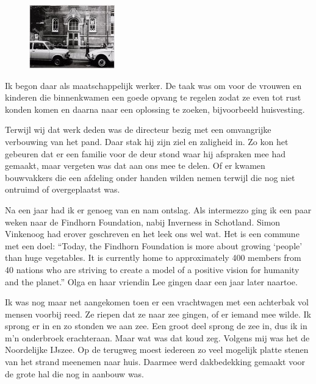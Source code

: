 \documentclass[10pt,twoside, openright]{memoir}
\begin{document}
\begin{figure}
\includegraphics[width=\textwidth]{img/ch43/hvo}
\end{figure}

Ik begon daar als maatschappelijk werker. De taak was om voor de vrouwen en kinderen die binnenkwamen een goede opvang te regelen zodat ze even tot rust konden komen en daarna naar een oplossing te zoeken, bijvoorbeeld huisvesting. 

Terwijl wij dat werk deden was de directeur bezig met een omvangrijke verbouwing van het pand. Daar stak hij zijn ziel en zaligheid in. Zo kon het gebeuren dat er een familie voor de deur stond waar hij afspraken mee had gemaakt, maar vergeten was dat aan ons mee te delen. Of er kwamen bouwvakkers die een afdeling onder handen wilden nemen terwijl die nog niet ontruimd of overgeplaatst was. 

Na een jaar had ik er genoeg van en nam ontslag. Als intermezzo ging ik een paar weken naar de Findhorn Foundation, nabij Inverness in Schotland. Simon Vinkenoog had erover geschreven en het leek ons wel wat. Het is een commune met een doel: ``Today, the Findhorn Foundation is more about growing `people' than huge vegetables. It is currently home to approximately 400 members from 40 nations who are striving to create a model of a positive vision for humanity and the planet.'' Olga en haar vriendin Lee gingen daar een jaar later naartoe.

Ik was nog maar net aangekomen toen er een vrachtwagen met een achterbak vol mensen voorbij reed. Ze riepen dat ze naar zee gingen, of er iemand mee wilde. Ik sprong er in en zo stonden we aan zee. Een groot deel sprong de zee in, dus ik in m’n onderbroek erachteraan. Maar wat was dat koud zeg. Volgens mij was het de Noordelijke IJszee. Op de terugweg moest iedereen zo veel mogelijk platte stenen van het strand meenemen naar huis. Daarmee werd dakbedekking gemaakt voor de grote hal die nog in aanbouw was. 
\end{document}
